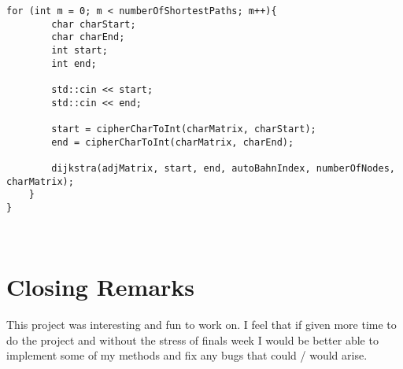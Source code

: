 \documentclass[11pt]{article}
\begin{document}
\begin {lstlisting}[frame=single]
    for (int m = 0; m < numberOfShortestPaths; m++){
        char charStart;
        char charEnd;
        int start;
        int end;
        
        std::cin << start;
        std::cin << end;
        
        start = cipherCharToInt(charMatrix, charStart);
        end = cipherCharToInt(charMatrix, charEnd);
                
        dijkstra(adjMatrix, start, end, autoBahnIndex, numberOfNodes, charMatrix);
    }      
}        

   

\end{lstlisting}
\section{Closing Remarks}
This project was interesting and fun to work on. I feel that if given more time to do the project and without the stress of finals week I would be better able to implement some of my methods and fix any bugs that could / would arise.
\end{document}
